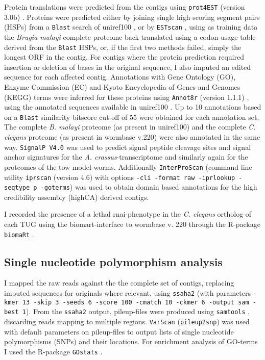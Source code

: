 Protein translations were predicted from the contigs using
\texttt{prot4EST} (version 3.0b)
\cite{wasmuth_prot4est:_2004}. Proteins were predicted either by
joining single high scoring segment pairs (HSPs) from a \texttt{Blast}
search of uniref100 \cite{pmid18836194}, or by \texttt{ESTscan}
\cite{estscan}, using as training data the \textit{Brugia malayi}
complete proteome back-translated using a codon usage table derived
from the \texttt{Blast} HSPs, or, if the first two methods failed,
simply the longest ORF in the contig. For contigs where the protein
prediction required insertion or deletion of bases in the original
sequence, I also imputed an edited sequence for each affected
contig. Annotations with Gene Ontology (GO), Enzyme Commission (EC)
and Kyoto Encyclopedia of Genes and Genomes (KEGG) terms were inferred
for these proteins using \texttt{Annot8r} (version 1.1.1)
\cite{schmid_annot8r:_2008}, using the annotated sequences available
in uniref100 \cite{pmid18836194}. Up to 10 annotations based on a
\texttt{Blast} similarity bitscore cut-off of 55 were obtained for
each annotation set. The complete \textit{B. malayi} proteome (as
present in uniref100) and the complete \textit{C. elegans} proteome
(as present in wormbase v.220) were also annotated in the same
way. \texttt{SignalP V4.0} \cite{pmid21959131} was used to predict
signal peptide cleavage sites and signal anchor signatures for the
\textit{A. crassus}-transcriptome and similarly again for the
proteomes of the tow model-worms.  Additionally \texttt{InterProScan}
\cite{pmid11590104} (command line utility \texttt{iprscan} (version
4.6) with options \texttt{-cli -format raw -iprlookup -seqtype p
  -goterms}) was used to obtain domain based annotations for the high
credibility assembly (highCA) derived contigs.

I recorded the presence of a lethal rnai-phenotype in the
\textit{C. elegans} ortholog of each TUG using the biomart-interface
\cite{pmid22083790} to wormbase v. 220 through the R-package
\texttt{biomaRt} \cite{pmid19617889}.

\subsection{Single nucleotide polymorphism analysis}

I mapped the raw reads against the the complete set of contigs,
replacing imputed sequences for originals where relevant, using
\texttt{ssaha2} \cite{pmid11591649} (with parameters \texttt{-kmer 13
  -skip 3 -seeds 6 -score 100 -cmatch 10 -ckmer 6 -output sam -best
  1}). From the \texttt{ssaha2} output, pileup-files were produced
using \texttt{samtools} \cite{journals/bioinformatics/LiHWFRHMAD09},
discarding reads mapping to multiple regions. \texttt{VarScan}
\cite{pmid19542151} (\texttt{pileup2snp}) was used with default
parameters on pileup-files to output lists of single nucleotide
polymorphisms (SNPs) and their locations. For enrichment analysis of
GO-terms I used the R-package \texttt{GOstats} \cite{pmid17098774}.

